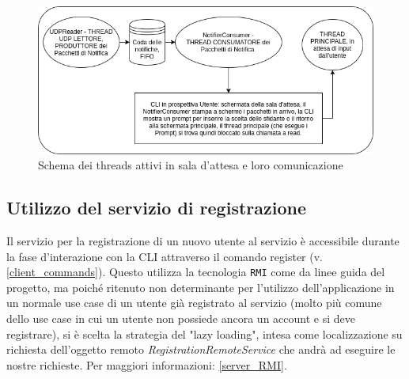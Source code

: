 \documentclass{article}
\begin{document}
    \begin{figure}[htp]
        \centering
        \includegraphics[width=\textwidth]{threads_client_2.png}
        \caption{Schema dei threads attivi in sala d'attesa e loro comunicazione}
        \label{fig:thread_client_2}
    \end{figure}

    \subsection{Utilizzo del servizio di registrazione} \label{client_RMI}
    Il servizio per la registrazione di un nuovo utente al servizio è accessibile durante la fase d'interazione con la CLI attraverso il comando register (v.\ref{client_commands}). Questo utilizza la tecnologia \texttt{RMI} come da linee guida del progetto, ma poiché ritenuto non determinante per l'utilizzo dell'applicazione in un normale use case di un utente già registrato al servizio (molto più comune dello use case in cui un utente non possiede ancora un account e si deve registrare), si è scelta la strategia del "lazy loading", intesa come localizzazione su richiesta dell'oggetto remoto \emph{RegistrationRemoteService} che andrà ad eseguire le nostre richieste. Per maggiori informazioni: \ref{server_RMI}.
\end{document}
